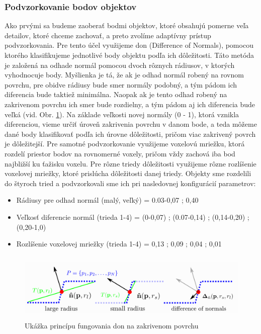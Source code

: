 \subsubsection{Podvzorkovanie bodov objektov}
\noindent Ako prvými sa budeme zaoberať bodmi objektov, ktoré obsahujú pomerne veľa detailov, ktoré chceme zachovať, a preto zvolíme adaptívny prístup podvzorkovania.
\newline\indent Pre tento účel využijeme \acrshort{don} (Difference of Normals), pomocou ktorého klasifikujeme jednotlivé body objektu podľa ich dôležitosti. Táto metóda je založená na odhade normál pomocou dvoch rôznych rádiusov, v ktorých vyhodnocuje body. Myšlienka je tá, že ak je odhad normál robený na rovnom povrchu, pre obidve rádiusy bude smer normály podobný, a tým pádom ich diferencia bude taktiež minimálna. Naopak ak je tento odhad robený na zakrivenom povrchu ich smer bude rozdielny, a tým pádom aj ich diferencia bude veľká (vid. Obr. \ref{fig:Don_principle}). Na základe veľkosti novej normály (0 - 1), ktorá vznikla diferenciou, vieme určiť úroveň zakrivenia povrchu v danom bode, a teda môžeme dané body klasifikovať podľa ich úrovne dôležitosti, pričom viac zakrivený povrch je dôležitejší.
\newline\indent Pre samotné podvzorkovanie využijeme voxelovú mriežku, ktorá rozdelí priestor bodov na rovnomerné voxely, pričom vždy zachová iba bod najbližší ku ťažisku voxelu. Pre rôzne triedy dôležitosti využijeme rôzne rozlíšenie voxelovej mriežky, ktoré prislúcha dôležitosti danej triedy. Objekty sme rozdelili do štyroch tried a podvzorkovali sme ich pri nasledovnej konfigurácií parametrov:

\begin{itemize}
  \setlength\itemsep{0.2em}
  \item Rádiusy pre odhad normál (malý, veľký) = 0.03-0,07 ; 0,40
  \item Veľkosť diferencie normál (trieda 1-4) = (0-0,07) ; (0.07-0,14) ; (0,14-0,20) ; (0,20-1,0)
  \item Rozlíšenie voxelovej mriežky (trieda 1-4) = 0,13 ; 0,09 ; 0,04 ; 0,01 
\end{itemize}

\begin{figure}[!htbp]
  \centering
  \includegraphics[width=15cm, height=3.3cm]{img/Don_principle.png}
  \caption{Ukážka princípu fungovania \acrshort{don} na zakrivenom povrchu \cite{DoN_segmentation}} 
  \label{fig:Don_principle}
\end{figure} 

